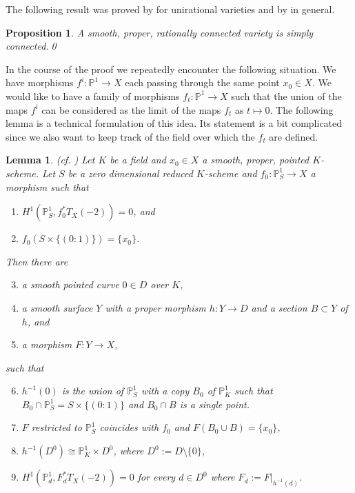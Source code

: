 \documentclass[12pt,twoside]{amsart}
\newcommand{\p}[0]{{\mathbb P}}
\newtheorem{lem}[thm]{Lemma}
\newtheorem{prop}[thm]{Proposition}
\theoremstyle{definition}
\theoremstyle{remark}
\begin{document}
The following result was proved by 
\cite{serre} for unirational varieties and  by \cite{campana-twist, kmm3}
 in general.

\begin{prop}\label{rc->simp.conn}
A  smooth, proper, rationally connected variety is simply connected.\qed
\end{prop}




In the course of the proof we repeatedly encounter the following
situation.  We have morphisms $f^i:\p^1\to X$
each passing through the same point $x_0\in X$.
We would like to have a family of morphisms $f_t:\p^1\to X$
such that the union of the maps $f^i$ can be considered as the limit
of the maps $f_t$ as $t\mapsto 0$. The following lemma is a
technical formulation of this idea. Its statement is  a bit complicated 
since we also want to keep track of the field over
 which the $f_t$ are defined.



\begin{lem}(cf. \cite[3.2]{rcloc})
\label{smoothing.lem} Let $K$ be a field
and $x_0\in X$ a  smooth, proper, pointed  $K$-scheme. Let
$S$ be a zero dimensional reduced $K$-scheme
and $f_0:\p^1_S\to X$ a morphism such that
\begin{enumerate}
\item  $H^1(\p^1_S,f_0^*T_X(-2))=0$, and
\item $f_0(S\times \{(0{\colon\!} 1)\})=\{x_0\}$.
\end{enumerate}
Then there are
\begin{enumerate}\setcounter{enumi}{2}
\item   a smooth pointed curve $0\in D$ over $K$,
\item  a smooth surface $Y$ with a proper morphism
$h:Y\to D$ and a section $B\subset Y$ of $h$, and
\item a morphism $F:Y\to X$,
\end{enumerate}
such that
\begin{enumerate}\setcounter{enumi}{5}
\item    $h^{-1}(0)$ is the union of $\p^1_S$ with a copy 
$B_0$ of $\p^1_K$ such that  $B_0\cap \p^1_S=
S\times \{(0{\colon\!} 1)\}$ and $B_0\cap B$ is a single point.
\item   $F$ restricted to $\p^1_S$ coincides with $f_0$
and $F(B_0\cup B)=\{x_0\}$,
\item  $h^{-1}(D^0)\cong \p^1_K\times  D^0$, where $D^0:=D\setminus \{0\}$,
\item $H^1(\p^1_d, F_d^*T_X(-2))=0$  for every
$d\in D^0$ where $F_d:=F|_{h^{-1}(d)}$.
\end{enumerate}
\end{lem}
\end{document}
